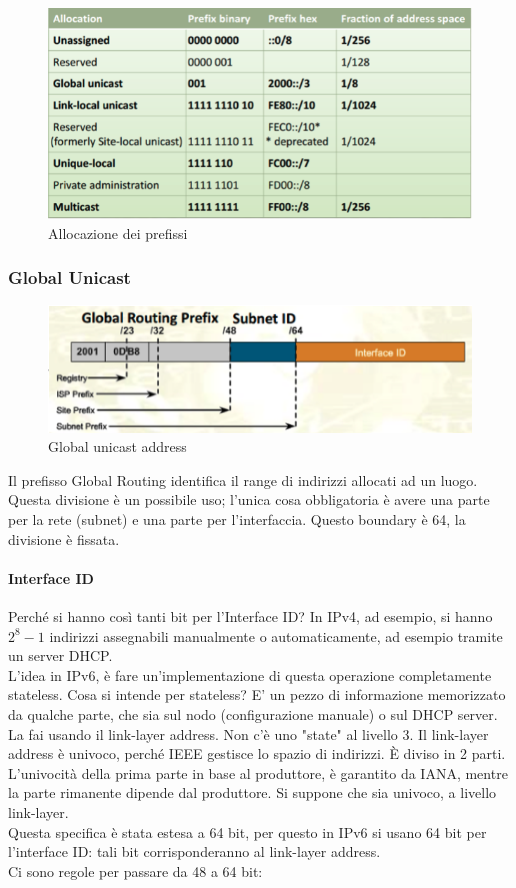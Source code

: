 \documentclass{article}
\begin{document}
\begin{figure}[H]
\centering
\includegraphics[scale=0.5]{figures/prefix notation.png}
\caption{Allocazione dei prefissi}
\end{figure}

\subsubsection{Global Unicast}

\begin{figure}[H]
\centering
\includegraphics[scale=0.5]{figures/global unicast.png}
\caption{Global unicast address}
\end{figure}

Il prefisso Global Routing identifica il range di indirizzi allocati ad un luogo. Questa divisione è un possibile uso; l'unica cosa obbligatoria è avere una parte per la rete (subnet) e una parte per l'interfaccia. Questo boundary è 64, la divisione è fissata.

\paragraph{Interface ID}
Perché si hanno così tanti bit per l'Interface ID? In IPv4, ad esempio, si hanno $2^{8}-1$ indirizzi assegnabili manualmente o automaticamente, ad esempio tramite un server DHCP. \\ L'idea in IPv6, è fare un'implementazione di questa operazione completamente stateless. Cosa si intende per stateless? E' un pezzo di informazione memorizzato da qualche parte, che sia sul nodo (configurazione manuale) o sul DHCP server. La fai usando il link-layer address. Non c'è uno "state" al livello 3. Il link-layer address è univoco, perché IEEE gestisce lo spazio di indirizzi. È diviso in 2 parti. L'univocità della prima parte in base al produttore, è garantito da IANA, mentre la parte rimanente dipende dal produttore. Si suppone che sia univoco, a livello link-layer. \\ Questa specifica è stata estesa a 64 bit, per questo in IPv6 si usano 64 bit per l'interface ID: tali bit corrisponderanno al link-layer address. \\ Ci sono regole per passare da 48 a 64 bit:
\end{document}
